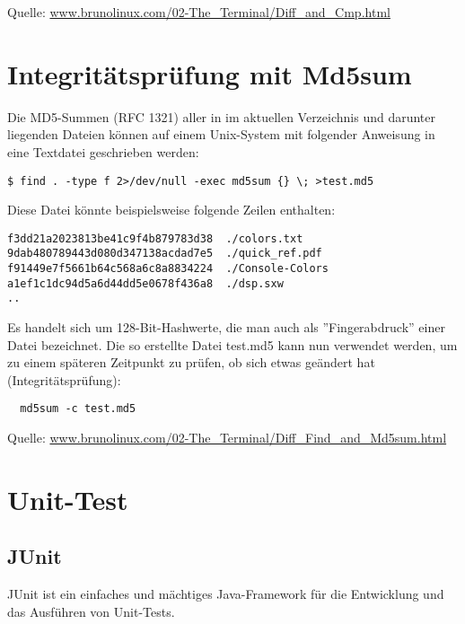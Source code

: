 Quelle:
\href{http://www.brunolinux.com/02-The_Terminal/Diff_and_Cmp.html}
{www.brunolinux.com/02-The\_Terminal/Diff\_and\_Cmp.html}
\newslide
\section{Integritätsprüfung mit Md5sum}
Die MD5-Summen (RFC 1321)
aller in im aktuellen Verzeichnis und darunter
liegenden Dateien können auf einem Unix-System mit folgender Anweisung
in eine Textdatei geschrieben werden:
\begin{lstlisting}
$ find . -type f 2>/dev/null -exec md5sum {} \; >test.md5
\end{lstlisting}
Diese Datei könnte beispielsweise folgende Zeilen enthalten:
\begin{lstlisting}
f3dd21a2023813be41c9f4b879783d38  ./colors.txt
9dab480789443d080d347138acdad7e5  ./quick_ref.pdf
f91449e7f5661b64c568a6c8a8834224  ./Console-Colors
a1ef1c1dc94d5a6d44dd5e0678f436a8  ./dsp.sxw
..
\end{lstlisting}
\newslide
Es handelt sich um 128-Bit-Hashwerte, die man auch als
''Fingerabdruck'' einer Datei bezeichnet.
Die so erstellte Datei test.md5 kann nun verwendet werden,
um zu einem späteren Zeitpunkt
zu prüfen, ob sich etwas geändert hat (Integritätsprüfung):
\begin{lstlisting}
  md5sum -c test.md5
\end{lstlisting}
Quelle: \href{http://www.brunolinux.com/02-The_Terminal/Diff_Find_and_Md5sum.html}
  {www.brunolinux.com/02-The\_Terminal/Diff\_Find\_and\_Md5sum.html}
%
\newslide
\section{Unit-Test}
\subsection{JUnit}
JUnit ist ein einfaches und mächtiges Java-Framework für die
Entwicklung und das Ausführen von Unit-Tests.

